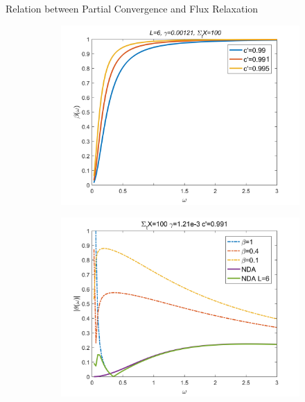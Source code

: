 \begin{frame}{Relation between Partial Convergence and Flux Relaxation}
\vspace{-1em}
 \begin{figure}
	\centering
	\captionsetup[subfigure]{justification=centering}
	\begin{subfigure}[t]{0.45\textwidth}
		\centering
 		\includegraphics[width=\textwidth]{Texfile/Figure/betavomega.png}
	\end{subfigure}
	\begin{subfigure}[t]{0.45\textwidth}
		\centering
		\includegraphics[width=\textwidth]{Texfile/Figure/rhovo_n.png}

\end{subfigure}
\end{figure}
\end{frame}
